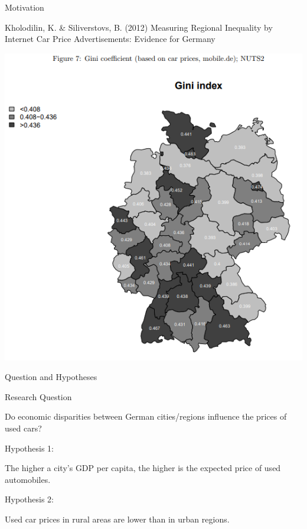 \documentclass[11pt,ignorenonframetext,]{beamer}
\begin{document}
\begin{frame}{Motivation}

Kholodilin, K. \& Siliverstovs, B. (2012) Measuring Regional Inequality
by Internet Car Price Advertisements: Evidence for Germany

\begin{center}\includegraphics[width=0.8\linewidth,height=0.8\textheight]{gini_coeffs} \end{center}

\end{frame}

\begin{frame}{Question and Hypotheses}

\begin{block}{Research Question}

Do economic disparities between German cities/regions influence the
prices of used cars?

\end{block}

\begin{block}{Hypothesis 1:}

The higher a city's GDP per capita, the higher is the expected price of
used automobiles.

\end{block}

\begin{block}{Hypothesis 2:}

Used car prices in rural areas are lower than in urban regions.

\end{block}

\end{frame}
\end{document}
